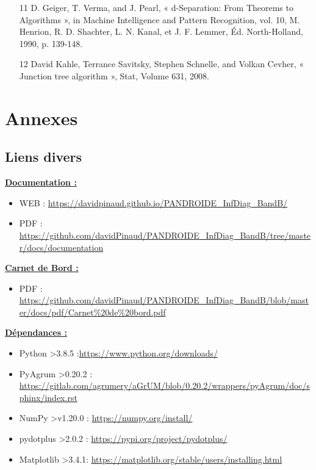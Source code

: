 \documentclass[12pt]{article}
\begin{document}
\begin{itemize}
\item[11] D. Geiger, T. Verma, and J. Pearl, « d-Separation: From Theorems to Algorithms », in Machine Intelligence and Pattern Recognition, vol. 10, M. Henrion, R. D. Shachter, L. N. Kanal, et J. F. Lemmer, Éd. North-Holland, 1990, p. 139‐148.

\item[12]David Kahle, Terrance Savitsky, Stephen Schnelle, and Volkan Cevher, « Junction tree algorithm », Stat, Volume 631, 2008.
\end{itemize}

\newpage


\section{Annexes}
\subsection{Liens divers}
\underline{\textbf{Documentation : }}
\begin{itemize}
    \item WEB : \url{https://davidpinaud.github.io/PANDROIDE_InfDiag_BandB/}
    \item PDF : \url{https://github.com/davidPinaud/PANDROIDE_InfDiag_BandB/tree/master/docs/documentation}
\end{itemize}
\underline{\textbf{Carnet de Bord : }}
\begin{itemize}
    \item PDF : \url{https://github.com/davidPinaud/PANDROIDE_InfDiag_BandB/blob/master/docs/pdf/Carnet\%20de\%20bord.pdf}
\end{itemize}
\underline{\textbf{Dépendances : }}
\begin{itemize}
    \item Python >3.8.5 :\url{https://www.python.org/downloads/}
    \item PyAgrum >0.20.2 : \url{https://gitlab.com/agrumery/aGrUM/blob/0.20.2/wrappers/pyAgrum/doc/sphinx/index.rst}
    \item NumPy >v1.20.0 : \url{https://numpy.org/install/}
    \item pydotplus >2.0.2 : \url{https://pypi.org/project/pydotplus/}
    \item Matplotlib >3.4.1: \url{https://matplotlib.org/stable/users/installing.html}
\end{itemize}
\end{document}
